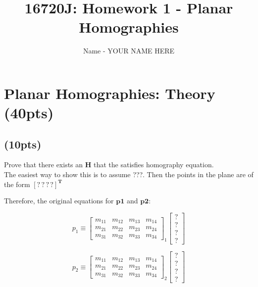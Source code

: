 \documentclass[12pt]{article}
\begin{document}
\title{16720J: Homework 1 - Planar Homographies}

\author{Name - YOUR NAME HERE}

\maketitle

\setcounter{section}{2}

\section{Planar Homographies: Theory (40pts)}

\subsection{(10pts)}

Prove that there exists an $\bm{ H}$ that the satisfies homography equation.
\\
The easiest way to show this is to assume ???. Then the points in the plane are of the form $\bm{[?\,?\,?\,?]^T}$

Therefore, the original equations for $\bm{p1}$ and $\bm{p2}$:

\begin{equation}
  p_1 \equiv \left[ \begin{matrix}
      m_{11} & m_{12} & m_{13} & m_{14} \\
      m_{21} & m_{22} & m_{23} & m_{24} \\
      m_{31} & m_{32} & m_{33} & m_{34}
    \end{matrix} \right]_1
\left[ \begin{matrix}
?\\
?\\
?\\
?
\end{matrix} \right]
\end{equation}

\begin{equation}
  p_2 \equiv \left[ \begin{matrix}
      m_{11} & m_{12} & m_{13} & m_{14} \\
      m_{21} & m_{22} & m_{23} & m_{24} \\
      m_{31} & m_{32} & m_{33} & m_{34}
    \end{matrix} \right]_2
\left[ \begin{matrix}
?\\
?\\
?\\
?
\end{matrix} \right]
\end{equation}
\end{document}
